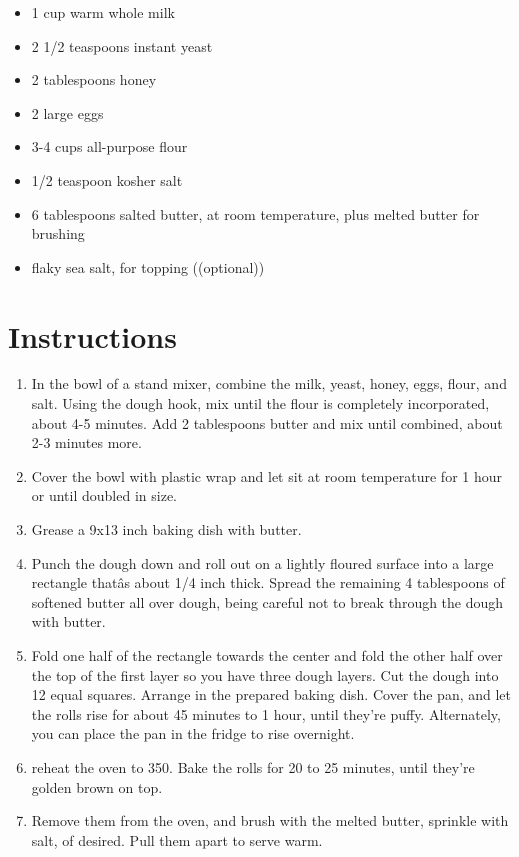 \documentclass[
  letterpaper,
  DIV=11,
  numbers=noendperiod,
  titlepage=false]{scrreprt}
\providecommand{\tightlist}{%
  \setlength{\itemsep}{0pt}\setlength{\parskip}{0pt}}\usepackage{longtable,booktabs,array}
\begin{document}
\begin{itemize}
\tightlist
\item
  1 cup warm whole milk
\item
  2 1/2 teaspoons instant yeast
\item
  2 tablespoons honey
\item
  2 large eggs
\item
  3-4 cups all-purpose flour
\item
  1/2 teaspoon kosher salt
\item
  6 tablespoons salted butter, at room temperature, plus melted butter
  for brushing
\item
  flaky sea salt, for topping ((optional))
\end{itemize}

\section{Instructions}\label{instructions-49}

\begin{enumerate}
\def\labelenumi{\arabic{enumi}.}
\tightlist
\item
  In the bowl of a stand mixer, combine the milk, yeast, honey, eggs,
  flour, and salt. Using the dough hook, mix until the flour is
  completely incorporated, about 4-5 minutes. Add 2 tablespoons butter
  and mix until combined, about 2-3 minutes more.
\item
  Cover the bowl with plastic wrap and let sit at room temperature for 1
  hour or until doubled in size.
\item
  Grease a 9x13 inch baking dish with butter.
\item
  Punch the dough down and roll out on a lightly floured surface into a
  large rectangle thatâs about 1/4 inch thick. Spread the remaining 4
  tablespoons of softened butter all over dough, being careful not to
  break through the dough with butter.
\item
  Fold one half of the rectangle towards the center and fold the other
  half over the top of the first layer so you have three dough layers.
  Cut the dough into 12 equal squares. Arrange in the prepared baking
  dish. Cover the pan, and let the rolls rise for about 45 minutes to 1
  hour, until they're puffy. Alternately, you can place the pan in the
  fridge to rise overnight.
\item
  reheat the oven to 350. Bake the rolls for 20 to 25 minutes, until
  they're golden brown on top.
\item
  Remove them from the oven, and brush with the melted butter, sprinkle
  with salt, of desired. Pull them apart to serve warm.
\end{enumerate}
\end{document}
